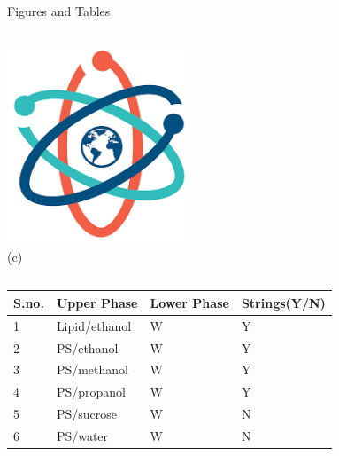 \documentclass[12pt,aspect=169]{beamer}
\begin{document}
\begin{frame}{Figures and Tables}
\begin{columns}[T]
\includegraphics[width=0.96\textwidth]{science} \\(c)


\end{columns}

\tiny
\begin{tabular}{llll}
	\toprule
	S.no. &  Upper Phase & Lower Phase & Strings(Y/N)\\
	\midrule
	1& Lipid/ethanol & W & Y \\
	2& PS/ethanol & W & Y \\
	3& PS/methanol & W & Y\\
	4& PS/propanol & W & Y\\
	5& PS/sucrose & W & N\\
	6& PS/water & W & N\\
	\bottomrule
\end{tabular}

\end{frame}
\end{document}

